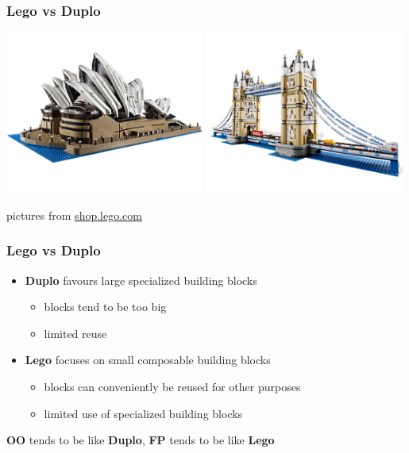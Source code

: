 \documentclass[aspectratio=169]{beamer}
\begin{document}
\begin{frame}[t]
  \frametitle{Lego vs Duplo}
  \begin{center}
    \includegraphics[width=0.49\textwidth]{static-images/lego-sydney-opera.jpg}
    \includegraphics[width=0.49\textwidth]{static-images/lego-tower-bridge.jpg}
  \end{center}
  \vspace{3mm}
  \begin{center}
    {\tiny pictures from \url{shop.lego.com}}
  \end{center}
\end{frame}

\begin{frame}
  \frametitle{Lego vs Duplo}
  \begin{itemize}
  \item<1-> \textbf{Duplo} favours large specialized building blocks
    \begin{itemize}
    \item<1-> blocks tend to be too big
    \item<1-> limited reuse
    \end{itemize}
  \item<2-> \textbf{Lego} focuses on small composable building blocks
    \begin{itemize}
    \item<2-> blocks can conveniently be reused for other purposes
    \item<2-> limited use of specialized building blocks
    \end{itemize}
  \end{itemize}
  \vfill
  \begin{center}
    \textbf{OO} tends to be like \textbf{Duplo}, \textbf{FP} tends to
    be like \textbf{Lego}
  \end{center}
\end{frame}
\end{document}
